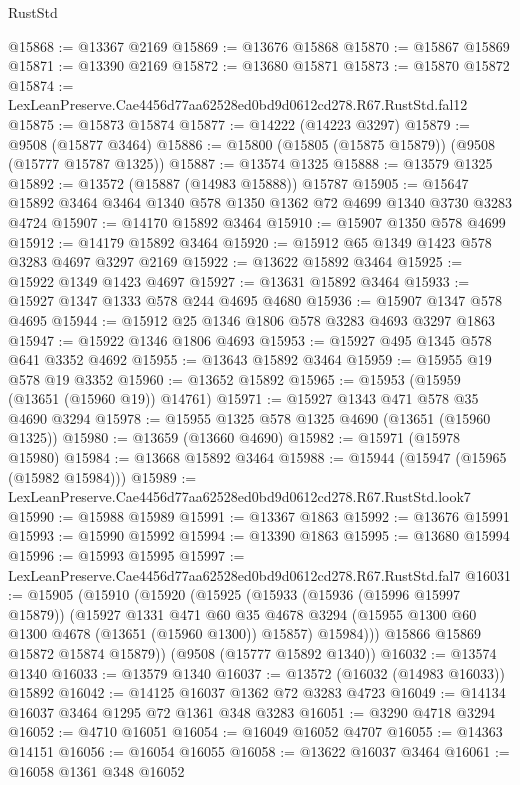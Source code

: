 \begin{lexlean}{RustStd}
\begin{coremodule}
@15868 := @13367 @2169
@15869 := @13676 @15868
@15870 := @15867 @15869
@15871 := @13390 @2169
@15872 := @13680 @15871
@15873 := @15870 @15872
@15874 := LexLeanPreserve.Cae4456d77aa62528ed0bd9d0612cd278.R67.RustStd.fal12
@15875 := @15873 @15874
@15877 := @14222 (@14223 @3297)
@15879 := @9508 (@15877 @3464)
@15886 := @15800 (@15805 (@15875 @15879)) (@9508 (@15777 @15787 @1325))
@15887 := @13574 @1325
@15888 := @13579 @1325
@15892 := @13572 (@15887 (@14983 @15888)) @15787
@15905 := @15647 @15892 @3464 @3464 @1340 @578 @1350 @1362 @72 @4699 @1340 @3730 @3283 @4724
@15907 := @14170 @15892 @3464
@15910 := @15907 @1350 @578 @4699
@15912 := @14179 @15892 @3464
@15920 := @15912 @65 @1349 @1423 @578 @3283 @4697 @3297 @2169
@15922 := @13622 @15892 @3464
@15925 := @15922 @1349 @1423 @4697
@15927 := @13631 @15892 @3464
@15933 := @15927 @1347 @1333 @578 @244 @4695 @4680
@15936 := @15907 @1347 @578 @4695
@15944 := @15912 @25 @1346 @1806 @578 @3283 @4693 @3297 @1863
@15947 := @15922 @1346 @1806 @4693
@15953 := @15927 @495 @1345 @578 @641 @3352 @4692
@15955 := @13643 @15892 @3464
@15959 := @15955 @19 @578 @19 @3352
@15960 := @13652 @15892
@15965 := @15953 (@15959 (@13651 (@15960 @19)) @14761)
@15971 := @15927 @1343 @471 @578 @35 @4690 @3294
@15978 := @15955 @1325 @578 @1325 @4690 (@13651 (@15960 @1325))
@15980 := @13659 (@13660 @4690)
@15982 := @15971 (@15978 @15980)
@15984 := @13668 @15892 @3464
@15988 := @15944 (@15947 (@15965 (@15982 @15984)))
@15989 := LexLeanPreserve.Cae4456d77aa62528ed0bd9d0612cd278.R67.RustStd.look7
@15990 := @15988 @15989
@15991 := @13367 @1863
@15992 := @13676 @15991
@15993 := @15990 @15992
@15994 := @13390 @1863
@15995 := @13680 @15994
@15996 := @15993 @15995
@15997 := LexLeanPreserve.Cae4456d77aa62528ed0bd9d0612cd278.R67.RustStd.fal7
@16031 := @15905
    (@15910
      (@15920
        (@15925
          (@15933
            (@15936 (@15996 @15997 @15879))
            (@15927
              @1331
              @471
              @60
              @35
              @4678
              @3294
              (@15955 @1300 @60 @1300 @4678 (@13651 (@15960 @1300)) @15857)
              @15984)))
        @15866
        @15869
        @15872
        @15874
        @15879))
    (@9508 (@15777 @15892 @1340))
@16032 := @13574 @1340
@16033 := @13579 @1340
@16037 := @13572 (@16032 (@14983 @16033)) @15892
@16042 := @14125 @16037 @1362 @72 @3283 @4723
@16049 := @14134 @16037 @3464 @1295 @72 @1361 @348 @3283
@16051 := @3290 @4718 @3294
@16052 := @4710 @16051
@16054 := @16049 @16052 @4707
@16055 := @14363 @14151
@16056 := @16054 @16055
@16058 := @13622 @16037 @3464
@16061 := @16058 @1361 @348 @16052

\end{coremodule}
\end{lexlean}
